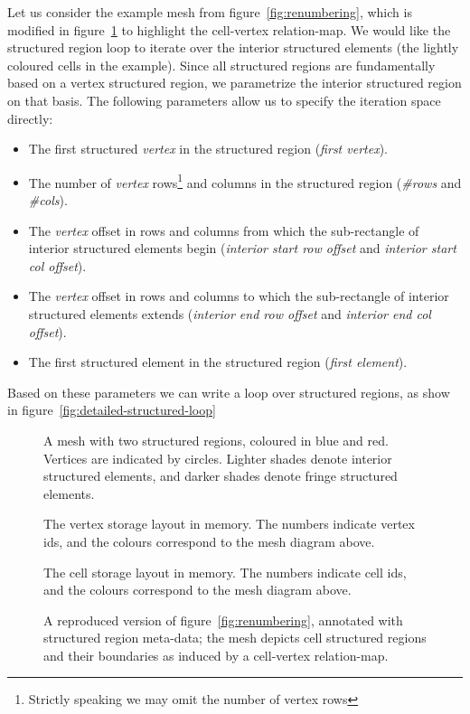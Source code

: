 Let us consider the example mesh from figure~\ref{fig:renumbering}, which is modified in figure~\ref{fig:structured-cell-mesh} to highlight the cell-vertex relation-map. We would like the structured region loop to iterate over the interior structured elements (the lightly coloured cells in the example). Since all structured regions are fundamentally based on a vertex structured region, we parametrize the interior structured region on that basis. The following parameters allow us to specify the iteration space directly:
\begin{itemize}
\item The first structured \emph{vertex} in the structured region (\emph{first vertex}).
\item The number of \emph{vertex} rows\footnote{Strictly speaking we may omit the number of vertex rows} and columns in the structured region (\emph{\#rows} and \emph{\#cols}).
\item The \emph{vertex} offset in rows and columns from which the sub-rectangle of interior structured elements begin (\emph{interior start row offset} and \emph{interior start col offset}).
\item The \emph{vertex} offset in rows and columns to which the sub-rectangle of interior structured elements extends (\emph{interior end row offset} and \emph{interior end col offset}).
\item The first structured element in the structured region (\emph{first element}).
\end{itemize}

Based on these parameters we can write a loop over structured regions, as show in figure~\ref{fig:detailed-structured-loop}


\begin{figure}
\sidebysidethreevertical
{
	
	\caption{A mesh with two structured regions, coloured in blue and red. Vertices are indicated by circles. Lighter shades denote interior structured elements, and darker shades denote fringe structured elements.}
}
{
	\small
	\tabcolsep=0.32mm
	
	\caption{The vertex storage layout in memory. The numbers indicate vertex ids, and the colours correspond to the mesh diagram above.}
}
{
	\small
	\tabcolsep=0.32mm
	
	\caption{The cell storage layout in memory. The numbers indicate cell ids, and the colours correspond to the mesh diagram above.}
}
\caption{A reproduced version of figure~\ref{fig:renumbering}, annotated with structured region meta-data; the mesh depicts cell structured regions and their boundaries as induced by a cell-vertex relation-map.}
\label{fig:structured-cell-mesh}
\end{figure}


